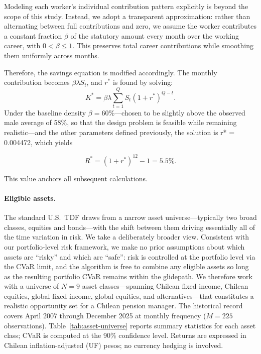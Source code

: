 \documentclass[11pt]{article}
\newcommand{\Rstar}{R^{*}}
\begin{document}
Modeling each worker's individual contribution pattern explicitly is beyond the scope of this study. Instead, we adopt a transparent approximation: rather than alternating between full contributions 
and zero, we assume the worker contributes a constant fraction 
$\beta$ of the statutory amount every month over the working career, 
with $0 < \beta \leq 1$. This preserves total career contributions 
while smoothing them uniformly across months.
 
Therefore, the savings equation is modified accordingly. The monthly 
contribution becomes $\beta\lambda S_t$, and $r^*$ is found by solving:
\begin{equation}
K^* = \beta\lambda \sum_{t=1}^{Q} S_t (1 + r^*)^{Q-t}.
\end{equation}
Under the baseline density $\beta=60\%$---chosen to be slightly above the observed male average of 58\%, so that the design problem is feasible while remaining realistic---and the other parameters defined previously, the solution is r* = 0.004472, which yields 

\begin{equation}
\Rstar = (1+r^*)^{12}-1 = 5.5\%.
\end{equation}


This value anchors all subsequent calculations.

\paragraph{Eligible assets.}
The standard U.S.\ TDF draws from a narrow asset universe---typically 
two broad classes, equities and bonds---with the shift between them 
driving essentially all of the time variation in risk. We take a 
deliberately broader view. Consistent with our portfolio-level risk 
framework, we make no prior assumptions about which assets are 
``risky'' and which are ``safe'': risk is controlled at the portfolio 
level via the CVaR limit, and the algorithm is free to combine any 
eligible assets so long as the resulting portfolio CVaR remains within 
the glidepath. We therefore work with a universe of $N=9$ asset 
classes---spanning Chilean fixed income, Chilean equities, global fixed 
income, global equities, and alternatives---that constitutes a realistic 
opportunity set for a Chilean pension manager. The historical record 
covers April 2007 through December 2025 at monthly frequency 
($M=225$ observations). Table~\ref{tab:asset-universe} reports summary 
statistics for each asset class; CVaR is computed at the 90\% confidence level.  Returns are expressed in Chilean inflation-adjusted (UF) pesos; no currency hedging is involved.
\end{document}
